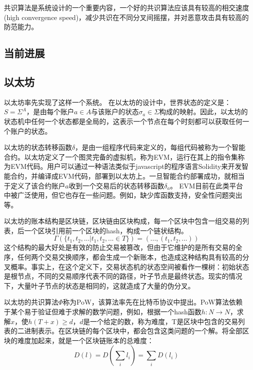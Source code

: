 \documentclass[UTF8,nofonts]{ctexart}
\begin{document}
\begin{multicols}{2}
共识算法是系统设计的一个重要内容，一个好的共识算法应该具有较高的相交速度(high convergence speed)，减少共识在不同分叉间摇摆，并对恶意攻击具有较高的防范能力。

\subsection{当前进展}
\subsection{以太坊}
以太坊\cite{buterin2017ethereum}率先实现了这样一个系统。
在以太坊的设计中，世界状态的定义是：$S = \Sigma^{A}$，是由每个账户$a \in A$与该账户的状态$\sigma_{a} \in \Sigma$构成的映射。因此，以太坊的状态机中任何一个状态都是全局的，这表示一个节点在每个时刻都可以获取任何一个账户的状态。

以太坊的状态转移函数$\delta$，是由一组程序代码来定义的，每组代码被称为一个智能合约。以太坊定义了一个图灵完备的虚拟机，称为EVM，运行在其上的指令集称为EVM代码。用户可以通过一种语法类似于javascript的程序语言Solidity来开发智能合约，并编译成EVM代码，部署到以太坊上\cite{dannen2017introducing}。一旦智能合约部署成功，就相当于定义了该合约账户$a$收到一个交易后的状态转移函数$\delta_{a}$。
EVM目前在此类平台中被广泛使用，但它也存在一些问题。例如，缺少库函数支持，安全性问题突出等。

以太坊的账本结构是区块链\cite{nakamoto2008bitcoin}，区块链由区块构成，每一个区块中包含一组交易的列表，后一个区块引用前一个区块的hash，构成一个链状结构。
\begin{equation}
\Gamma(\lbrace t_{1}, t_{2},...\vert t_{1}, t_{2},... \in T \rbrace) = (..., (t_{1}, t_{2},...)) 
\end{equation}
这个结构的最大好处是有效的防止交易被篡改，但由于它维护的是所有交易的全序，任何两个交易交换顺序，都会生成一个新账本，也造成这种结构具有较高的分叉概率。事实上，在这个定义下，交易状态机的状态空间被看作一棵树：初始状态是根节点，不同的交易顺序代表不同的路径，叶子节点是最终状态。现实的情况下，大量叶子节点的状态是相同的，这就造成了大量的伪分叉。

以太坊的共识算法$\Phi$称为PoW，该算法率先在比特币协议中提出\cite{nakamoto2008bitcoin}。PoW算法依赖于某个易于验证但难于求解的数学问题，例如，根据一个hash函数$h:N \rightarrow N$，求解$x$，使$h(T+x) \geq d$，$d$是一个给定的数，称为难度，T是区块中包含的交易列表的二进制表示。在区块链的每个区块中，都会包含这类问题的一个解。将全部区块的难度加起来，就是一个区块链账本的总难度：
\begin{equation}
D(l) = D(\sum_{i} l_{i}) = \sum_{i} D(l_{i})
\end{equation}


\end{multicols}
\end{document}
